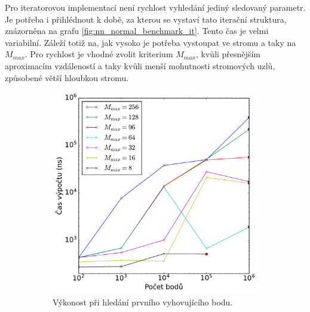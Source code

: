Pro iteratorovou implementací není rychlost vyhledání jediný sledovaný parametr. Je potřeba i přihlédnout k době, za kterou se vystaví tato iterační struktura, znázorněna na grafu \ref{fig:nn_normal_benchmark_it}. Tento čas je velmi variabilní. Záleží totiž na, jak vysoko je potřeba vystoupat ve stromu a taky na $M_{max}$. Pro rychlost je vhodné zvolit kriterium $M_{max}$, kvůli přesnějším aproximacím vzdáleností a taky kvůli menší mohutnosti stromových uzlů, způsobené větší hloubkou stromu. 
\begin{figure}[ht]
\begin{subfigure}[t]{0.49\columnwidth}
    \centering  
    \includegraphics[scale=0.4]{obrazky-figures/benchmark/nn_normal/benchmark_nn_normal_speed_nnNormalFirst.pdf}
\caption{Výkonost při hledání prvního vyhovujícího bodu.}
\end{subfigure}
\hfill
\begin{subfigure}[t]{0.49\columnwidth}
    \centering  

\end{subfigure}
\end{figure}
